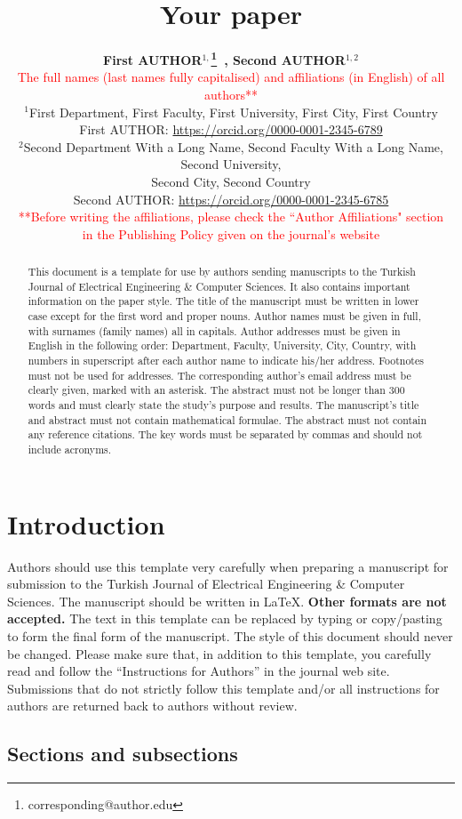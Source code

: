 \documentclass{elektr}
\title{Your paper}
\author[AUTHOR and AUTHOR]{
	\textbf{First AUTHOR$^{1,}$\thanks{corresponding@author.edu}~, Second AUTHOR$^{1,2}$}\\
	\textcolor{red}{The full names (last names fully capitalised) and affiliations (in English) of all authors**}\\ 
	$^{1}$First Department, First Faculty, First University, First City, First Country\\ 	First AUTHOR: \url{https://orcid.org/0000-0001-2345-6789} \\
	$^{2}$Second Department With a Long Name, Second Faculty With a Long Name, Second University,\\ Second City, Second Country\\ Second AUTHOR: \url{https://orcid.org/0000-0001-2345-6785}\\
	\textcolor{red}{**Before writing the affiliations, please check the ``Author Affiliations" section}\\ 
	\textcolor{red}{in the Publishing Policy given on the journal’s website}\\ [1.8em]

\rec{...}
\acc{...}
\finv{...}
}
\begin{document}
\maketitle

\begin{abstract}This document is a template for use by authors sending manuscripts to the Turkish Journal of Electrical Engineering {\&} Computer Sciences. It also contains important information on the paper style. The title of the manuscript must be written in lower case except for the first word and proper nouns. Author names must be given in full, with surnames (family names) all in capitals. Author addresses must be given in English in the following order: Department, Faculty, University, City, Country, with numbers in superscript after each author name to indicate his/her address. Footnotes must not be used for addresses. The corresponding author's email address must be clearly given, marked with an asterisk. The abstract must not be longer than 300 words and must clearly state the study's purpose and results. The manuscript's title and abstract must not contain mathematical formulae. The abstract must not contain any reference citations. The key words must be separated by commas and should not include acronyms.

\end{abstract}

\section{Introduction}
\label{Int}

Authors should use this template very carefully when preparing a manuscript for submission to the Turkish Journal of Electrical Engineering {\&} Computer Sciences. The manuscript should be written in \LaTeX. \textbf{Other formats are not accepted.} The text in this template can be replaced by typing or copy/pasting to form the final form of the manuscript. The style of this document should never be changed. Please make sure that, in addition to this template, you carefully read and follow the ``Instructions for Authors'' in the journal web site. Submissions that do not strictly follow this template and/or all instructions for authors are returned back to authors without review.

\subsection{Sections and subsections}
\end{document}
